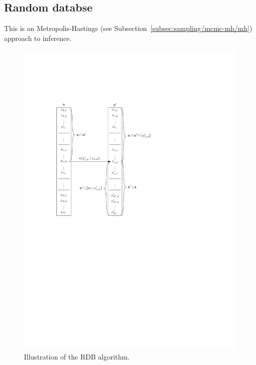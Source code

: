 \subsection{Random databse}
This is an Metropolis-Hastings (see Subsection~\ref{subsec:sampling/mcmc-mh/mh}) approach to inference.
\begin{figure}[!htb]
\centering
\includegraphics[scale=1]{pprog/how/figures/rdb/rdb}
\caption{Illustration of the RDB algorithm.}
\label{fig:pprog/how/figures/rdb}
\end{figure}
